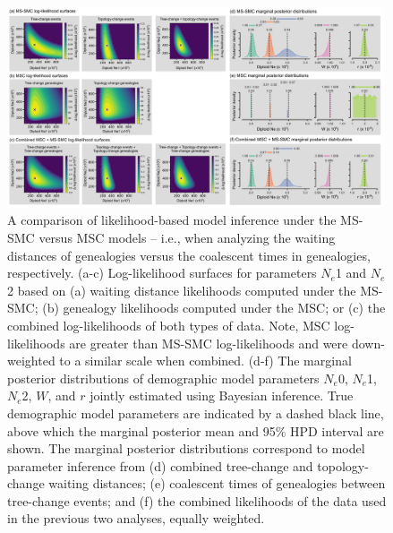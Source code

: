 \documentclass[11pt]{article}
\begin{document}
\begin{figure}[tbp!]
	\centering
	\includegraphics[width=0.99\textwidth]{figures/current/Fig8-MSC-SMC-surface-and-posterior2.pdf}
	\caption{
		A comparison of likelihood-based model inference under the MS-SMC 
		versus MSC models -- i.e., when analyzing the waiting distances of
		genealogies versus the coalescent times in genealogies, respectively.
		(a-c) Log-likelihood surfaces for parameters $N_e$1 and $N_e$2 based on 
		(a) waiting distance likelihoods computed under the MS-SMC;  
		(b) genealogy likelihoods computed under the MSC; or
		(c) the combined log-likelihoods of both types of data. 
		Note, MSC log-likelihoods are greater than MS-SMC log-likelihoods and 
		were down-weighted to a similar scale when combined.
		(d-f) The marginal posterior distributions of demographic model parameters 
		$N_e$0, $N_e$1, $N_e$2, $W$, and $r$ jointly estimated using Bayesian inference.
		True demographic model parameters are indicated by a dashed black line, above 
		which the marginal posterior mean and 95\% HPD interval are shown.
		The marginal posterior distributions correspond to model parameter inference
		from (d) combined tree-change and topology-change waiting distances;
		(e) coalescent times of genealogies between tree-change events; and 
		(f) the combined likelihoods of the data used in the previous two analyses, 
		equally weighted.
	}
	\label{fig:likelihood-posteriors}
\end{figure}
\end{document}
